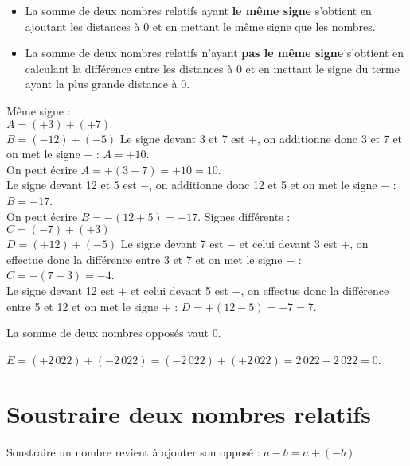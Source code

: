 \begin{methode*2*2}
   \begin{itemize}
      \item La somme de deux nombres relatifs ayant {\bf le même signe} s'obtient en ajoutant les distances à 0 et en mettant le même signe que les nombres. 
      \item La somme de deux nombres relatifs n'ayant {\bf pas le même signe} s'obtient en calculant la différence entre les distances à 0 et en mettant le signe du terme ayant la plus grande distance à 0.
   \end{itemize}
   \exercice
      Même signe : \\
      $A =(+3)+(+7)$ \\
      $B =(-12)+(-5)$
   \correction
      Le signe devant 3 et 7 est $+$, on additionne donc 3 et 7 et on met le signe $+$ : $A =+10$. \\
      On peut écrire $A =+(3+7) =+10 =10$. \\
      Le signe devant 12 et 5 est $-$, on additionne donc 12 et 5 et on met le signe $-$ : $B =-17$. \\
      On peut écrire $B =-(12+5) =-17$.
   \exercice
      Signes différents : \\
      $C =(-7)+(+3)$ \\
      $D =(+12)+(-5)$
   \correction
      Le signe devant 7 est $-$ et celui devant 3 est $+$, on effectue donc la différence entre 3 et 7 et on met le signe $-$ : $C =-(7-3) =-4$. \\
      Le signe devant 12 est $+$ et celui devant 5 est $-$, on effectue donc la différence entre 5 et 12 et on met le signe $+$ : $D =+(12-5) =+7 =7$. 
\end{methode*2*2}

\smallskip

\begin{propriete}
   La somme de deux nombres opposés vaut 0.
\end{propriete}

\begin{exemple*1}
   $E =(+2\,022)+(-2\,022) =(-2\,022)+(+2\,022) =2\,022-2\,022 =0$.
\end{exemple*1}


\section{Soustraire deux nombres relatifs} %

\begin{propriete}
   Soustraire un nombre revient à ajouter son opposé : $a-b=a+(-b)$.
\end{propriete}


